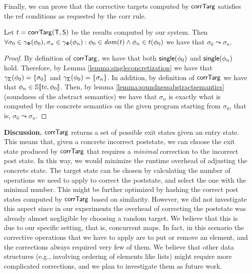 Finally, we can prove that the corrective targets computed by $\mathsf{corrTarg}$ satisfies the {\sf ref} conditions as requested by the {\sf corr} rule.

\begin{theorem}
	Let $t=\mathsf{corrTarg}(\mathsf{T}, \mathsf{S})$ be the results computed by our system. Then $\forall \sigma_0 \in \gamma_{\mathsf{\Phi}}(\phi_0), \sigma_n \in \gamma_{\mathsf{\Phi}}(\phi_n) : \phi_0 \in \mathit{dom}(t) \land \phi_n \in t(\phi_0)$ we have that $\sigma_0 \leadsto \sigma_n$.
\end{theorem}
\begin{proof}
By definition of $\mathsf{corrTarg}$, we have that both $\mathsf{single}(\phi_0)$ and $\mathsf{single}(\phi_n)$ hold. Therefore, by Lemma \ref{lemma:singleconcretization} we have that $\gamma_{\mathsf{\Sigma}}(\phi_0) = \{\sigma_0\}$ and $\gamma_{\mathsf{\Sigma}}(\phi_0) = \{\sigma_n\}$. In addition, by definition of $\mathsf{corrTarg}$ we have that $\phi_n \in \mathbb{S}\llbracket tc, \phi_0 \rrbracket$. Then, by lemma \ref{lemma:soundnessabstractsemantics} (soundness of the abstract semantics) we have that $\sigma_n$ is exactly what is computed by the concrete semantics on the given program starting from $\sigma_0$, that is, $\sigma_0 \leadsto \sigma_n$. 
\end{proof}



\noindent \textbf{Discussion.}
$\mathsf{corrTarg}$ returns a set of possible exit states given an entry state. This means that, given a concrete incorrect poststate, we can choose the exit state produced by $\mathsf{corrTarg}$ that requires a \emph{minimal} correction to the incorrect post state. In this way, we would minimize the runtime overhead of adjusting the concrete state. The target state can be chosen by calculating the number of operations we need to apply to correct the poststate, and select the one with the minimal number. This might be further optimized by hashing the correct post states computed by $\mathsf{corrTarg}$ based on similarity.
However, we did not investigate this aspect since in our experiments the overhead of correcting the poststate was already almost negligible by choosing a random target. We believe that this is due to our specific setting, that is, concurrent maps. In fact, in this scenario the corrective operations that we have to apply are to put or remove an element, and the corrections always required very few of them. We believe that other data structures (e.g., involving ordering of elements like lists) might require more complicated corrections, and we plan to investigate them as future work.


